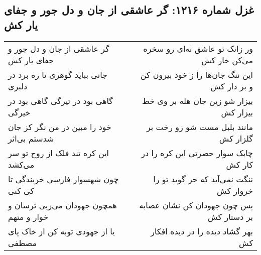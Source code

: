 \begin{center}
\section*{غزل شماره ۱۲۱۶: گر عاشقی از جان و دل جور و جفای یار کش}
\label{sec:1216}
\begin{longtable}{l p{0.5cm} r}
گر عاشقی از جان و دل جور و جفای یار کش
&&
ور زانک تو عاشق نه‌ای رو سخره می‌کن خار کش
\\
جانی بباید گوهری تا ره برد در دلبری
&&
این ننگ جان‌ها را ز خود بیرون کن و بر دار کش
\\
گاهی بود در تیرگی گاهی بود در خیرگی
&&
بیزار شو زین جان هله بر وی خط بیزار کش
\\
خود را مبین در من نگر کز جان شدستم بی‌اثر
&&
مانند بلبل مست شو زو رخت بر گلزار کش
\\
این کره تند فلک از روح تو سر می‌کشد
&&
چابک سوار حضرتی این کره را در کار کش
\\
چون شهسوار فارسی خربندگی تا کی کنی
&&
ننگت نمی‌آید که خر گوید تو را خروار کش
\\
همچون جهودان می‌زیی ترسان و خوار و متهم
&&
پس چون جهودان کن نشان عصابه بر دستار کش
\\
یا از جهودی توبه کن از خاک پای مصطفی
&&
بهر گشاد دیده را در دیده افکار کش
\\
\end{longtable}
\end{center}
